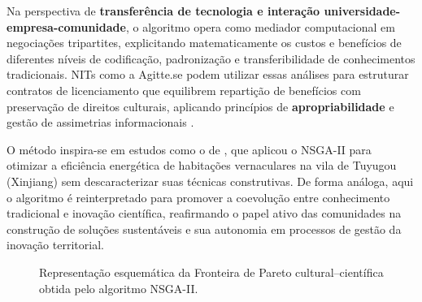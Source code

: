 Na perspectiva de \textbf{transferência de tecnologia e interação universidade-empresa-comunidade}, o algoritmo opera como mediador computacional em negociações tripartites, explicitando matematicamente os custos e benefícios de diferentes níveis de codificação, padronização e transferibilidade de conhecimentos tradicionais. NITs como a Agitte.se podem utilizar essas análises para estruturar contratos de licenciamento que equilibrem repartição de benefícios com preservação de direitos culturais, aplicando princípios de \textbf{apropriabilidade} \cite{Teece2007} e gestão de assimetrias informacionais \cite{AroraEtAl2001}.

O método inspira-se em estudos como o de \cite{Gou2024}, que aplicou o NSGA-II para otimizar a eficiência energética de habitações vernaculares na vila de Tuyugou (Xinjiang) sem descaracterizar suas técnicas construtivas. De forma análoga, aqui o algoritmo é reinterpretado para promover a coevolução entre conhecimento tradicional e inovação científica, reafirmando o papel ativo das comunidades na construção de soluções sustentáveis e sua autonomia em processos de gestão da inovação territorial.

\begin{figure}[H]
\centering
{}
\caption{Representação esquemática da Fronteira de Pareto cultural–científica obtida pelo algoritmo NSGA-II.}
\label{fig:pareto_nsga}
\end{figure}


\newpage

